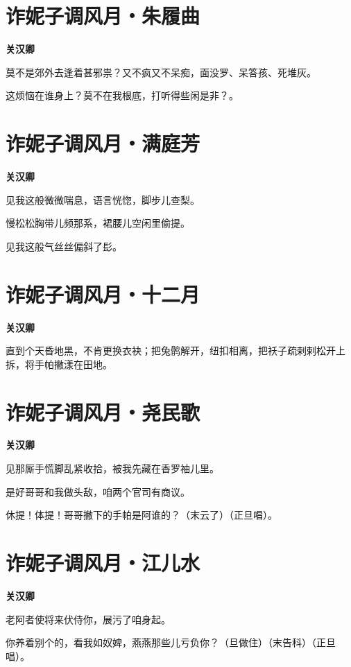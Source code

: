 \documentclass[12pt,a4paper]{ctexbook}
\begin{document}
\section{诈妮子调风月・朱履曲}
\textbf{关汉卿}\par\vspace{0.5em}
莫不是郊外去逢着甚邪祟？又不疯又不呆痴，面没罗、呆答孩、死堆灰。\par
这烦恼在谁身上？莫不在我根底，打听得些闲是非？。\par

\section{诈妮子调风月・满庭芳}
\textbf{关汉卿}\par\vspace{0.5em}
见我这般微微喘息，语言恍惚，脚步儿查梨。\par
慢松松胸带儿频那系，裙腰儿空闲里偷提。\par
见我这般气丝丝偏斜了髟。\par

\section{诈妮子调风月・十二月}
\textbf{关汉卿}\par\vspace{0.5em}
直到个天昏地黑，不肯更换衣袂；把兔鹘解开，纽扣相离，把袄子疏剌剌松开上拆，将手帕撇漾在田地。\par

\section{诈妮子调风月・尧民歌}
\textbf{关汉卿}\par\vspace{0.5em}
见那厮手慌脚乱紧收拾，被我先藏在香罗袖儿里。\par
是好哥哥和我做头敌，咱两个官司有商议。\par
休提！体提！哥哥撇下的手帕是阿谁的？（末云了）（正旦唱）。\par

\section{诈妮子调风月・江儿水}
\textbf{关汉卿}\par\vspace{0.5em}
老阿者使将来伏侍你，展污了咱身起。\par
你养着别个的，看我如奴婢，燕燕那些儿亏负你？（旦做住）（末告科）（正旦唱）。\par
\end{document}

